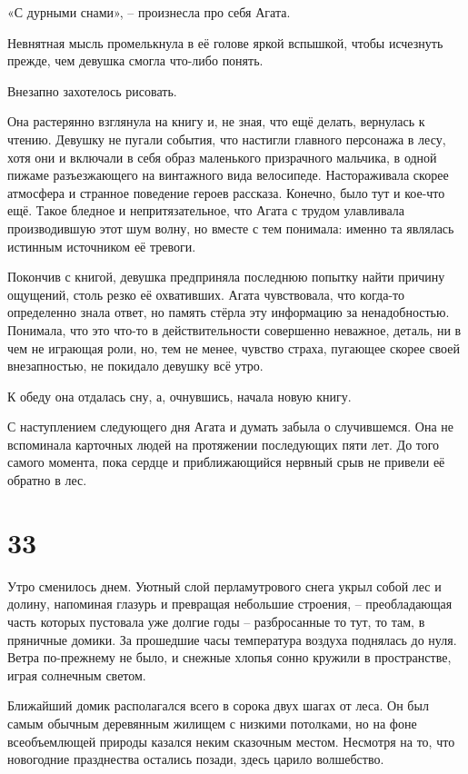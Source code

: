 \documentclass[
  a5paperpaper,
  DIV=11,
  numbers=noendperiod]{scrreprt}
\begin{document}
«С дурными снами», -- произнесла про себя Агата.

Невнятная мысль промелькнула в её голове яркой вспышкой, чтобы исчезнуть
прежде, чем девушка смогла что-либо понять.

Внезапно захотелось рисовать.

Она растерянно взглянула на книгу и, не зная, что ещё делать, вернулась
к чтению. Девушку не пугали события, что настигли главного персонажа в
лесу, хотя они и включали в себя образ маленького призрачного мальчика,
в одной пижаме разъезжающего на винтажного вида велосипеде.
Настораживала скорее атмосфера и странное поведение героев рассказа.
Конечно, было тут и кое-что ещё. Такое бледное и непритязательное, что
Агата с трудом улавливала производившую этот шум волну, но вместе с тем
понимала: именно та являлась истинным источником её тревоги.

Покончив с книгой, девушка предприняла последнюю попытку найти причину
ощущений, столь резко её охвативших. Агата чувствовала, что когда-то
определенно знала ответ, но память стёрла эту информацию за
ненадобностью. Понимала, что это что-то в действительности совершенно
неважное, деталь, ни в чем не играющая роли, но, тем не менее, чувство
страха, пугающее скорее своей внезапностью, не покидало девушку всё
утро.

К обеду она отдалась сну, а, очнувшись, начала новую книгу.

С наступлением следующего дня Агата и думать забыла о случившемся. Она
не вспоминала карточных людей на протяжении последующих пяти лет. До
того самого момента, пока сердце и приближающийся нервный срыв не
привели её обратно в лес.

\section*{33}\label{33}


Утро сменилось днем. Уютный слой перламутрового снега укрыл собой лес и
долину, напоминая глазурь и превращая небольшие строения, --
преобладающая часть которых пустовала уже долгие годы -- разбросанные то
тут, то там, в пряничные домики. За прошедшие часы температура воздуха
поднялась до нуля. Ветра по-прежнему не было, и снежные хлопья сонно
кружили в пространстве, играя солнечным светом.

Ближайший домик располагался всего в сорока двух шагах от леса. Он был
самым обычным деревянным жилищем с низкими потолками, но на фоне
всеобъемлющей природы казался неким сказочным местом. Несмотря на то,
что новогодние празднества остались позади, здесь царило волшебство.
\end{document}
